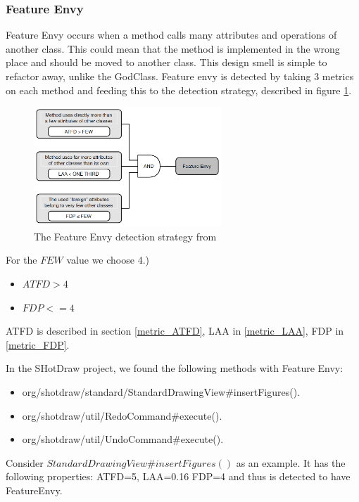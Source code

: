 \documentclass[onecolumn]{article}
\begin{document}
\subsubsection{Feature Envy}
Feature Envy occurs when a method calls many attributes and operations of another class. This could mean that the method is implemented in the wrong place and should be moved to another class. This design smell is simple to refactor away, unlike the GodClass.
Feature envy is detected by taking 3 metrics on each method and feeding this to the detection strategy, described in figure \ref{fig:lanza_FeatureEnvy}.

\begin{figure}[H]
    \centering
    \includegraphics[width=200pt]{fig/lanza_FeatureEnvy.PNG}
    \caption{The Feature Envy detection strategy from \protect\cite{lanza2007object}}
    \label{fig:lanza_FeatureEnvy}
\end{figure}

For the $FEW$ value we choose 4.)
\begin{itemize}
    \item $ATFD > 4$
    \item $FDP <= 4$
\end{itemize}

ATFD is described in section \ref{metric_ATFD}, LAA in \ref{metric_LAA}, FDP in \ref{metric_FDP}.

In the SHotDraw project, we found the following methods with Feature Envy:
\begin{itemize}
    \item org/shotdraw/standard/StandardDrawingView\#insertFigures().
    \item org/shotdraw/util/RedoCommand\#execute().
    \item org/shotdraw/util/UndoCommand\#execute().
\end{itemize}

Consider $StandardDrawingView\#insertFigures()$ as an example. It has the following properties: ATFD=5, LAA=0.16 FDP=4 and thus is detected to have FeatureEnvy.
\end{document}
